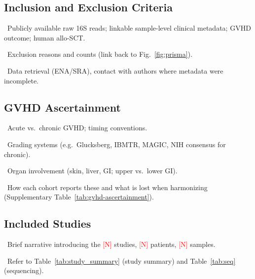 \documentclass[11pt,a4paper]{article}
\newcommand{\todoitem}[1]{\par\noindent\textcolor{blue!70!black}{\textbullet~#1}}
\newcommand{\ph}[1]{\textcolor{red}{[#1]}}  %
\begin{document}
\subsection{Inclusion and Exclusion Criteria}
\label{sec:cohort-criteria}
\todoitem{Publicly available raw 16S reads; linkable sample-level clinical metadata; GVHD outcome; human allo-SCT.}
\todoitem{Exclusion reasons and counts (link back to Fig.~\ref{fig:prisma}).}
\todoitem{Data retrieval (ENA/SRA), contact with authors where metadata were incomplete.}

\subsection{GVHD Ascertainment}
\label{sec:gvhd-ascertainment}
\todoitem{Acute vs.\ chronic GVHD; timing conventions.}
\todoitem{Grading systems (e.g.\ Glucksberg, IBMTR, MAGIC, NIH consensus for chronic).}
\todoitem{Organ involvement (skin, liver, GI; upper vs.\ lower GI).}
\todoitem{How each cohort reports these and what is lost when harmonizing (Supplementary Table~\ref{tab:gvhd-ascertainment}).}



\subsection{Included Studies}
\label{sec:cohort-studies}
\todoitem{Brief narrative introducing the \ph{N} studies, \ph{N} patients, \ph{N} samples.}
\todoitem{Refer to Table~\ref{tab:study_summary} (study summary) and Table~\ref{tab:seq} (sequencing).}
\end{document}
